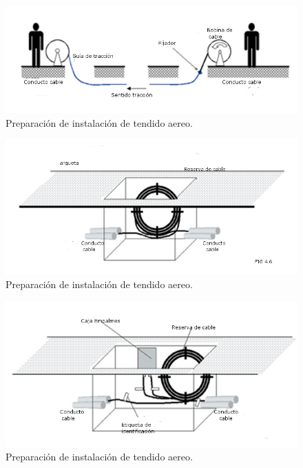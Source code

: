 \documentclass[12pt,letterpaper]{article}
\begin{document}
\newpage
\begin{figure}[ht]
    \centering
    \includegraphics[width=.9\textwidth]{imagenes/ts0.jpg}
    \caption{Preparación de instalación de tendido aereo.}
\end{figure}
\begin{figure}[ht]
    \centering
    \includegraphics[width=.9\textwidth]{imagenes/ts1.jpg}
    \caption{Preparación de instalación de tendido aereo.}
\end{figure}
\newpage
\begin{figure}[ht]
    \centering
    \includegraphics[width=.9\textwidth]{imagenes/ts2.jpg}
    \caption{Preparación de instalación de tendido aereo.}
\end{figure}


\newpage
\end{document}
